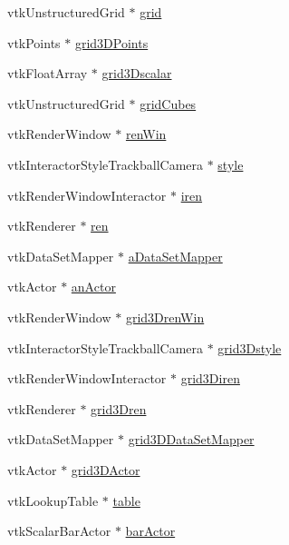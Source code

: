 \begin{DoxyCompactItemize}
\item 
vtk\-Unstructured\-Grid $\ast$ \hyperlink{classGeometry_aebabda9f0c07ecb986195857913b4ee8}{grid}
\item 
vtk\-Points $\ast$ \hyperlink{classGeometry_afd79778e7c244df18be79a39419190c8}{grid3\-D\-Points}
\item 
vtk\-Float\-Array $\ast$ \hyperlink{classGeometry_a3516628b6f6b85e9d0e025a768e6bd59}{grid3\-Dscalar}
\item 
vtk\-Unstructured\-Grid $\ast$ \hyperlink{classGeometry_a3111987cb4c958ed83fd09a4cdc81ad0}{grid\-Cubes}
\item 
vtk\-Render\-Window $\ast$ \hyperlink{classGeometry_a22b4feeba28c4834bc9ac42e838cb7bb}{ren\-Win}
\item 
vtk\-Interactor\-Style\-Trackball\-Camera $\ast$ \hyperlink{classGeometry_a994d1c4d7c8ce0622fcf7a96b5d234af}{style}
\item 
vtk\-Render\-Window\-Interactor $\ast$ \hyperlink{classGeometry_a6563f9a823d1dcee59554a5d093d6c73}{iren}
\item 
vtk\-Renderer $\ast$ \hyperlink{classGeometry_a0893a3a686dc14327816c9648efe8662}{ren}
\item 
vtk\-Data\-Set\-Mapper $\ast$ \hyperlink{classGeometry_af314d57676056969da57788a60954926}{a\-Data\-Set\-Mapper}
\item 
vtk\-Actor $\ast$ \hyperlink{classGeometry_a86a213e57fee0c578d220d8015c2891b}{an\-Actor}
\item 
vtk\-Render\-Window $\ast$ \hyperlink{classGeometry_af855a50f857e3aaa0ba5601daff0e73a}{grid3\-Dren\-Win}
\item 
vtk\-Interactor\-Style\-Trackball\-Camera $\ast$ \hyperlink{classGeometry_aac1ed80d797b14f337a0e9d3206c70c7}{grid3\-Dstyle}
\item 
vtk\-Render\-Window\-Interactor $\ast$ \hyperlink{classGeometry_a7db500f9e6786611a23fe22f562f0dce}{grid3\-Diren}
\item 
vtk\-Renderer $\ast$ \hyperlink{classGeometry_aafa37cf25f51c60ba5fa0e790994ce98}{grid3\-Dren}
\item 
vtk\-Data\-Set\-Mapper $\ast$ \hyperlink{classGeometry_af0f946b3abbf28a76d4c85f51cddd261}{grid3\-D\-Data\-Set\-Mapper}
\item 
vtk\-Actor $\ast$ \hyperlink{classGeometry_a2bf0d89ae708392842128430e08b0e32}{grid3\-D\-Actor}
\item 
vtk\-Lookup\-Table $\ast$ \hyperlink{classGeometry_aaabe40cbb12206d80e4376367568934b}{table}
\item 
vtk\-Scalar\-Bar\-Actor $\ast$ \hyperlink{classGeometry_af87eb1e4ab0922d0475afc67061ae30a}{bar\-Actor}

\end{DoxyCompactItemize}
